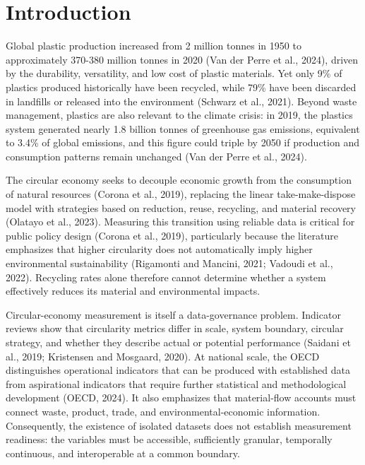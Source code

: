 \documentclass[review,10pt]{elsarticle}
\newcommand{\revpar}[1]{#1\par\medskip}
\DeclareRobustCommand{\change}[1]{#1}
\begin{document}
\section{Introduction}

\revpar{Global plastic production increased from 2 million tonnes in 1950 to approximately 370-380 million tonnes in 2020 (Van der Perre et al., 2024), driven by the durability, versatility, and low cost of plastic materials. Yet only 9\% of plastics produced historically have been recycled, while 79\% have been discarded in landfills or released into the environment (Schwarz et al., 2021). Beyond waste management, plastics are also relevant to the climate crisis: in 2019, the plastics system generated nearly 1.8 billion tonnes of greenhouse gas emissions, equivalent to 3.4\% of global emissions, and this figure could triple by 2050 if production and consumption patterns remain unchanged (Van der Perre et al., 2024).}

\revpar{The circular economy seeks to decouple economic growth from the consumption of natural resources (\change{Corona et al., 2019}), replacing the linear take-make-dispose model with strategies based on reduction, reuse, recycling, and material recovery (Olatayo et al., 2023). Measuring this transition using reliable data is critical for public policy design (\change{Corona et al., 2019}), particularly because the literature emphasizes that higher circularity does not automatically imply higher environmental sustainability (Rigamonti and Mancini, 2021; Vadoudi et al., 2022). Recycling rates alone therefore cannot determine whether a system effectively reduces its material and environmental impacts.}

\revpar{Circular-economy measurement is itself a data-governance problem. Indicator reviews show that circularity metrics differ in scale, system boundary, circular strategy, and whether they describe actual or potential performance (Saidani et al., 2019; Kristensen and Mosgaard, 2020). At national scale, the OECD distinguishes operational indicators that can be produced with established data from aspirational indicators that require further statistical and methodological development (OECD, 2024). It also emphasizes that material-flow accounts must connect waste, product, trade, and environmental-economic information. Consequently, the existence of isolated datasets does not establish measurement readiness: the variables must be accessible, sufficiently granular, temporally continuous, and interoperable at a common boundary.}
\end{document}
